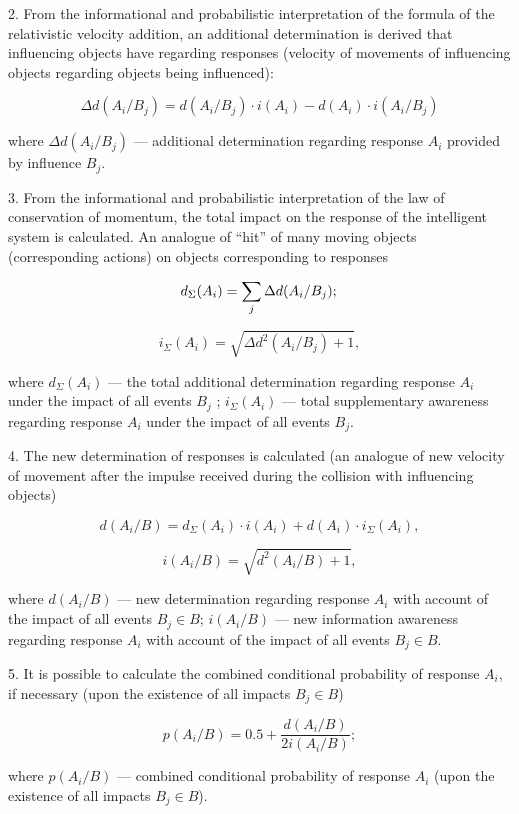 2. From the informational and probabilistic interpretation of the formula of the relativistic velocity addition, an additional determination is derived that influencing objects have regarding responses (velocity of movements of influencing objects regarding objects being influenced): 

\[
\Delta d(A_i/B_j)=d(A_i/B_j)\cdot i(A_i)-d(A_i)\cdot i(A_i/B_j)
\]

\noindent
where $\Delta d(A_i/B_j)$ — additional determination regarding response $A_i$ provided by influence $B_j$. 

3. From the informational and probabilistic interpretation of the law of conservation of momentum, the total impact on the response of the intelligent system is calculated. An analogue of “hit” of many moving objects (corresponding actions) on objects corresponding to responses

\[
d_\Sigma(A_i) = \sum_j \Delta d(A_i/B_j); \\
\]

\[
i_\Sigma(A_i) = \sqrt{\Delta d^2(A_i/B_j)+1},
\]

\noindent
where $d_\Sigma(A_i)$ — the total additional determination regarding response $A_i$ under the impact of all events $B_j$ ; $i_\Sigma(A_i)$ — total supplementary awareness regarding response $A_i$ under the impact of all events $B_j$. 

4. The new determination of responses is calculated (an analogue of new velocity of movement after the impulse received during the collision with influencing objects)

\begin{equation}
\label{eq:ifron2}
d(A_i/B)=d_\Sigma(A_i)\cdot i(A_i)+d(A_i)\cdot i_\Sigma(A_i),
\end{equation}


\[
i(A_i/B) = \sqrt{d^2(A_i/B)+1},
\]

\noindent
where $d(A_i/B)$ — new determination regarding response $A_i$ with account of the impact of all events $B_j \in B$; $i(A_i/B)$ — new information awareness regarding response $A_i$ with account of the impact of all events $B_j \in B$.

5. It is possible to calculate the combined conditional probability of response $A_i$, if necessary (upon the existence of all impacts $B_j \in B$)

\[
p(A_i/B)=0.5+\frac{d(A_i/B)}{2i(A_i/B)};
\]

\noindent
where $p(A_i/B)$ — combined conditional probability of response $A_i$ (upon the existence of all impacts $B_j \in B$).

